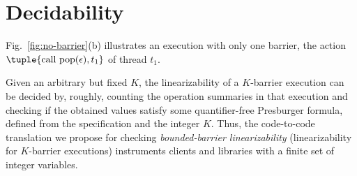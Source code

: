 \section{Decidability}




Fig.~\ref{fig:no-barrier}(b) illustrates an execution with only one barrier, the action $\tuple{\mathrm{call}\ \mathrm{pop}(\epsilon),t_1}$ of thread $t_1$.

Given an arbitrary but fixed $K$, the linearizability of a $K$-barrier execution can be decided by, roughly, counting the operation summaries in that execution and checking if the obtained values satisfy some quantifier-free Presburger formula, defined from the specification and the integer $K$. Thus, the code-to-code translation we propose for checking \emph{bounded-barrier linearizability} (\ie linearizability for $K$-barrier executions) instruments clients and libraries with a finite set of integer variables. %

\vspace{-2mm}




